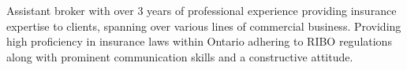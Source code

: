 \begin{cvletter}


Assistant broker with over 3 years of professional experience providing insurance expertise to clients, spanning over various lines of commercial business. Providing high proficiency in insurance laws within Ontario adhering to RIBO regulations along with prominent communication skills and a constructive attitude. %


\end{cvletter}